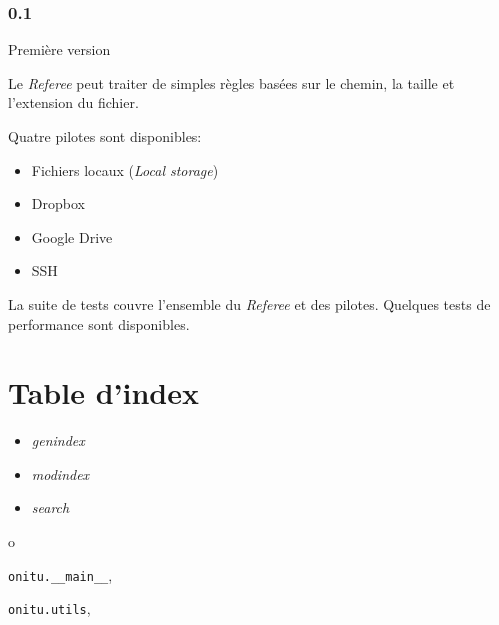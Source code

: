 \documentclass[letterpaper,10pt,english]{sphinxmanual}
\begin{document}
\subsection{0.1}
\label{changelog:id1}
Première version

Le \emph{Referee} peut traiter de simples règles basées sur le chemin, la taille et l'extension du fichier.

Quatre pilotes sont disponibles:
\begin{itemize}
\item {} 
Fichiers locaux (\emph{Local storage})

\item {} 
Dropbox

\item {} 
Google Drive

\item {} 
SSH

\end{itemize}

La suite de tests couvre l'ensemble du \emph{Referee} et des pilotes. Quelques tests de performance sont disponibles.


\chapter{Table d'index}
\label{index:indices-and-tables}\begin{itemize}
\item {} 
\emph{genindex}

\item {} 
\emph{modindex}

\item {} 
\emph{search}

\end{itemize}


\renewcommand{\indexname}{Index des modules Python}
\begin{theindex}
\def\bigletter#1{{\Large\sffamily#1}\nopagebreak\vspace{1mm}}
\bigletter{o}
\item {\texttt{onitu.\_\_main\_\_}}, \pageref{components:module-onitu.__main__}
\item {\texttt{onitu.utils}}, \pageref{components:module-onitu.utils}
\end{theindex}

\renewcommand{\indexname}{Index}
\printindex
\end{document}
